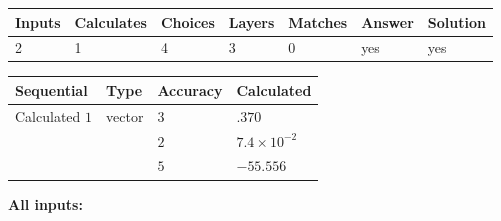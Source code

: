 \documentclass[12pt]{article}
\begin{document}
 
 
\noindent{}
 
 

 
 
\vspace{0.3in}
   
   
   
   
\noindent\begin{tabular}{|l|l|l|l|l|l|l|}
 \hline
Inputs & Calculates & Choices & Layers & Matches & Answer & Solution \\ \hline
           2 & 
           1 & 
           4
  & 
           3 & 
           0 & 
  yes & 
  yes 
  \\ \hline
 \end{tabular}
   
   
   
   
\noindent{}
   
   
  
  
\noindent\begin{tabular}{|l|l|l|l|}
\hline
 Sequential & Type & Accuracy & Calculated \\ 
\hline
 
 
  Calculated $           1$ & vector &  
  $           3 $ 
 &  $ .370 $ 
 \\    
  & & 
  $           2 $ 
 &  $ 7.4 \times 10^{-2} $ 
 \\    
  & & 
  $           5 $ 
 &  $ -55.556 $ 
 \\  \hline  
 \end{tabular}
   
   
   
   
\noindent\vspace{0.1in}\hspace{-0.08in} {\textbf{\Large{All inputs: }}}
   
   
  
\end{document}
